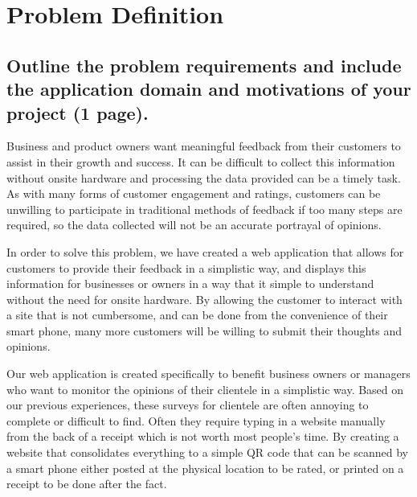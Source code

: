 \documentclass[letterpaper, 12 pt, conference]{ieeeconf}
\begin{document}
\thispagestyle{empty}
\pagestyle{empty}






\doublespacing 
\onecolumn

\section{Problem Definition}
\subsection{Outline the problem requirements and include the application domain and motivations of your project (1 page).}
\linebreak
Business and product owners want meaningful feedback from their customers to assist in their growth and success. It can be difficult to collect this information without onsite hardware and processing the data provided can be a timely task. As with many forms of customer engagement and ratings, customers can be unwilling to participate in traditional methods of feedback if too many steps are required, so the data collected will not be an accurate portrayal of opinions.
\newline


In order to solve this problem, we have created a web application that allows for customers to provide their feedback in a simplistic way, and displays this information for businesses or owners in a way that it simple to understand without the need for onsite hardware. By allowing the customer to interact with a site that is not cumbersome, and can be done from the convenience of their smart phone, many more customers will be willing to submit their thoughts and opinions.
\newline

Our web application is created specifically to benefit business owners or managers who want to monitor the opinions of their clientele in a simplistic way. Based on our previous experiences, these surveys for clientele are often annoying to complete or difficult to find. Often they require typing in a website manually from the back of a receipt which is not worth most people's time. By creating a website that consolidates everything to a simple QR code that can be scanned by a smart phone either posted at the physical location to be rated, or printed on a receipt to be done after the fact. 
\newline
\end{document}
